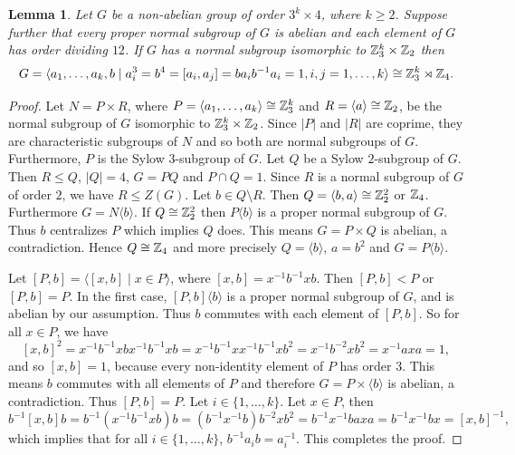 \documentclass{amsart}
\newtheorem{lem}[thm]{Lemma}
\def \leq {\leqslant}
\def \geq {\geqslant}
\begin{document}
\begin{lem}\label{conj}
	Let $G$ be a non-abelian group of order $3^k\times 4$, where $k\geq 2$. Suppose further that every proper normal subgroup of $G$ is abelian and each element of $G$ has order dividing $12$. If $G$ has a normal subgroup isomorphic to 
	$\Bbb Z_3^k\times\Bbb Z_2$ then 
	\[G=\langle a_1,\ldots,a_k,b\mid a_i^3=b^4=[a_i,a_j]=ba_ib^{-1}a_i=1, i,j=1,\ldots,k\rangle\cong\Bbb Z_3^k\rtimes\Bbb Z_4.\]
\end{lem}
\begin{proof}
	Let $N=P\times R$, where $P=\langle a_1,\ldots,a_k\rangle\cong\Bbb Z_3^k$ and $R=\langle a\rangle\cong\Bbb Z_2$, be the normal subgroup of $G$ isomorphic to $\Bbb Z_3^k\times\Bbb Z_2$. Since $|P|$ and $|R|$ are coprime, they are characteristic subgroups of $N$ and so both are normal subgroups of $G$. Furthermore, $P$ is the Sylow $3$-subgroup of $G$. Let $Q$ be a Sylow $2$-subgroup of $G$. Then $R\leq Q$, $|Q|=4$,  $G=PQ$ and $P\cap Q=1$. Since $R$ is a normal subgroup of $G$ of order $2$, we have $R\leq Z(G)$. Let $b\in Q\setminus R$. Then  $Q=\langle b,a\rangle\cong\Bbb Z_2^2$ or $\Bbb Z_4$. Furthermore $G=N\langle b\rangle$. If $Q\cong\Bbb Z_2^2$ then $P\langle b\rangle$ is a proper normal subgroup of $G$. Thus $b$ centralizes $P$ which implies $Q$ does. This means $G=P\times Q$ is abelian, a contradiction. Hence $Q\cong\Bbb Z_4$ and more precisely $Q=\langle b\rangle$, $a=b^2$ and $G=P\langle b\rangle$.
	
	Let $[P,b]=\langle [x,b]\mid x\in P\rangle$, where $[x,b]=x^{-1}b^{-1}xb$. Then $[P,b]<P$ or $[P,b]=P$. In the first case, $[P,b]\langle b\rangle$ is a proper normal subgroup of $G$, and is abelian by our assumption. Thus $b$ commutes with each element of $[P,b]$. So for all $x\in P$, we have
	\[[x,b]^2=x^{-1}b^{-1}xbx^{-1}b^{-1}xb=x^{-1}b^{-1}xx^{-1}b^{-1}xb^2=x^{-1}b^{-2}xb^2=x^{-1}axa=1,\] 
	and so $[x,b]=1$, because every non-identity element of $P$ has order $3$. This means $b$ commutes with all elements of $P$ and therefore $G=P\times\langle b\rangle$ is abelian, a contradiction. Thus
	$[P,b]=P$. Let $i\in\{1,\ldots,k\}$. Let $x\in P$, then 
	\[b^{-1}[x,b]b=b^{-1}(x^{-1}b^{-1}xb)b=(b^{-1}x^{-1}b)b^{-2}xb^2=b^{-1}x^{-1}baxa=b^{-1}x^{-1}bx=[x,b]^{-1},\]
	which implies that for all $i\in\{1,\ldots,k\}$, $b^{-1}a_ib=a_i^{-1}$. This completes the proof.
\end{proof}
\end{document}
